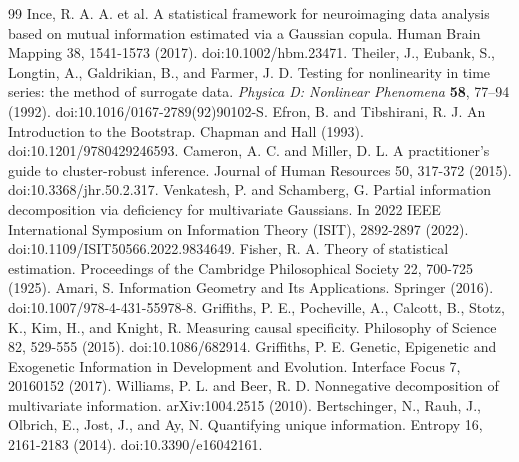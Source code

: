 \documentclass[11pt]{article}
\begin{document}
\begin{thebibliography}{99}
 Ince, R. A. A. et al. A statistical framework for neuroimaging data analysis based on mutual information estimated via a Gaussian copula. Human Brain Mapping 38, 1541-1573 (2017). doi:10.1002/hbm.23471.
Theiler, J., Eubank, S., Longtin, A., Galdrikian, B., and Farmer, J. D.
Testing for nonlinearity in time series: the method of surrogate data.
\textit{Physica D: Nonlinear Phenomena} \textbf{58}, 77--94 (1992).
doi:10.1016/0167-2789(92)90102-S.
 Efron, B. and Tibshirani, R. J. An Introduction to the Bootstrap. Chapman and Hall (1993). doi:10.1201/9780429246593.
 Cameron, A. C. and Miller, D. L. A practitioner's guide to cluster-robust inference. Journal of Human Resources 50, 317-372 (2015). doi:10.3368/jhr.50.2.317.
 Venkatesh, P. and Schamberg, G. Partial information decomposition via deficiency for multivariate Gaussians. In 2022 IEEE International Symposium on Information Theory (ISIT), 2892-2897 (2022). doi:10.1109/ISIT50566.2022.9834649.
 Fisher, R. A. Theory of statistical estimation. Proceedings of the Cambridge Philosophical Society 22, 700-725 (1925).
 Amari, S. Information Geometry and Its Applications. Springer (2016). doi:10.1007/978-4-431-55978-8.
 Griffiths, P. E., Pocheville, A., Calcott, B., Stotz, K., Kim, H., and Knight, R. Measuring causal specificity. Philosophy of Science 82, 529-555 (2015). doi:10.1086/682914.
 Griffiths, P. E. Genetic, Epigenetic and Exogenetic Information in Development and Evolution. Interface Focus 7, 20160152 (2017).
 Williams, P. L. and Beer, R. D. Nonnegative decomposition of multivariate information. arXiv:1004.2515 (2010).
 Bertschinger, N., Rauh, J., Olbrich, E., Jost, J., and Ay, N. Quantifying unique information. Entropy 16, 2161-2183 (2014). doi:10.3390/e16042161.
\end{thebibliography}
\end{document}
